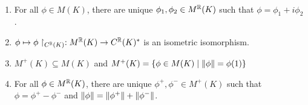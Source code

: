 \documentclass{article}
\begin{document}
\begin{nlemma}\label{lem:m-real-pos}~
  \begin{enumerate}
    \item For all $\phi \in M(K)$, there are unique $\phi_1, \phi_2 \in M^\mathbb R(K)$ such that $\phi = \phi_1 + i\phi_2$.
    \item $\phi \mapsto \phi\restriction_{C^\mathbb R(K)} : M^\mathbb R(K) \rightarrow C^\mathbb R(K)^*$ is an isometric isomorphism.
    \item $M^+(K) \subseteq M(K)$ and $M^+(K) = \{\phi \in M(K) \mid \left\lVert \phi\right\rVert = \phi(1)\}$
    \item For all $\phi \in M^\mathbb R(K)$, there are unique $\phi^+, \phi^- \in M^+(K)$ such that $\phi = \phi^+ - \phi^-$ and $\left\lVert \phi\right\rVert = \left\lVert \phi^+\right\rVert + \left\lVert \phi^-\right\rVert$.
  \end{enumerate}
\end{nlemma}
\end{document}
